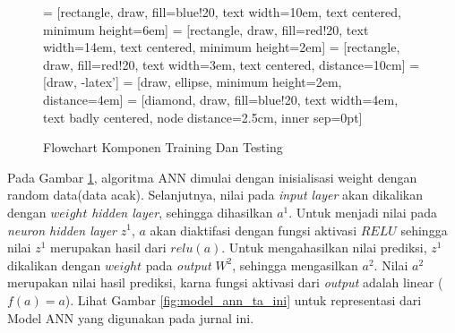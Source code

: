 \begin{figure}[ht]
  \caption{Flowchart Komponen Training Dan Testing}
  \begin{center}
    \footnotesize
     = [rectangle, draw, fill=blue!20, 
        text width=10em, text centered, minimum height=6em]
     = [rectangle, draw, fill=red!20, 
        text width=14em, text centered, minimum height=2em]
     = [rectangle, draw, fill=red!20, 
        text width=3em, text centered,  distance=10cm]
     = [draw, -latex']
     = [draw, ellipse, minimum height=2em, distance=4em]
     = [diamond, draw, fill=blue!20, 
        text width=4em, text badly centered, node distance=2.5cm, inner sep=0pt]
        
  \end{center}
  \label{fig:alur_ann}
\end{figure}
\FloatBarrier

Pada Gambar \ref{fig:alur_ann}, algoritma ANN dimulai dengan inisialisasi weight dengan random data(data acak). Selanjutnya, nilai pada \emph{input layer} akan dikalikan dengan $weight$ \emph{hidden layer}, sehingga dihasilkan $a^1$. Untuk menjadi nilai pada \emph{neuron hidden layer} $z^1$, $a$ akan diaktifasi dengan fungsi aktivasi $RELU$ sehingga nilai $z^1$ merupakan hasil dari $relu(a)$. Untuk mengahasilkan nilai prediksi, $z^1$ dikalikan dengan $weight$ pada \emph{output} $W^2$, sehingga mengasilkan $a^2$. Nilai $a^2$ merupakan nilai hasil prediksi, karna fungsi aktivasi dari \emph{output} adalah linear ($f(a) = a$). Lihat Gambar \ref{fig:model_ann_ta_ini} untuk representasi dari Model ANN yang digunakan pada jurnal ini.

\FloatBarrier
